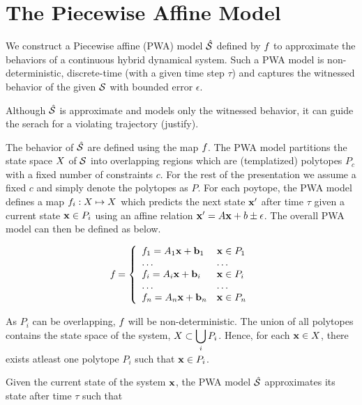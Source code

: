\section{The Piecewise Affine Model}

We construct a Piecewise affine (PWA) model $\hat{\mathcal{S}}$ defined by
$f_{}$ to approximate the behaviors of a continuous hybrid dynamical
system.  Such a PWA model is non-deterministic, discrete-time (with a
given time step $\tau$) and captures the witnessed behavior of the
given $\mathcal{S}$ with bounded error $\epsilon$.

Although $\hat{\mathcal{S}}$ is approximate and models only the witnessed
behavior, it can guide the serach for a violating trajectory
(justify).

The behavior of $\hat{\mathcal{S}}$ are defined using the map $f_{}$. The
PWA model partitions the state space $X$ of $\mathcal{S}$ into
overlapping regions which are (templatized) polytopes $P_{c}$ with a
fixed number of constraints $c$. For the rest of the presentation we
assume a fixed $c$ and simply denote the polytopes as $P$.  For each
poytope, the PWA model defines a map $f_{i}: X \mapsto
X$ which predicts the next state $\mathbf{x}'$ after time $\tau$
given a current state $\mathbf{x} \in P_i$ using an affine relation $\mathbf{x}' = A\mathbf{x} + b
\pm \epsilon$. The overall PWA model can then be defined as below.

\begin{equation}
    f_{} = \left\{
        \begin{array}{ll}
            f_{1} = A_1\mathbf{x} + \mathbf{b}_1 & \mathbf{x} \in P_1\\
            \ldots & \ldots\\
            f_{i} = A_i\mathbf{x} + \mathbf{b}_i & \mathbf{x} \in P_i\\
            \ldots & \ldots\\
            f_{n} = A_n\mathbf{x} + \mathbf{b}_n & \mathbf{x} \in P_n
        \end{array}
    \right.
\end{equation}

As $P_i$ can be overlapping, $f_{}$ will be non-deterministic. The
union of all polytopes contains the state space of the system,
$X \subset \displaystyle \bigcup_i P_i$. Hence, for each
$\mathbf{x}\in X$, there exists atleast one polytope $P_i$ such that
$\mathbf{x}\in P_i$.

Given the current state of the system $\mathbf{x}$, the PWA model
$\hat{\mathcal{S}}$ approximates its state after time $\tau$ such that

